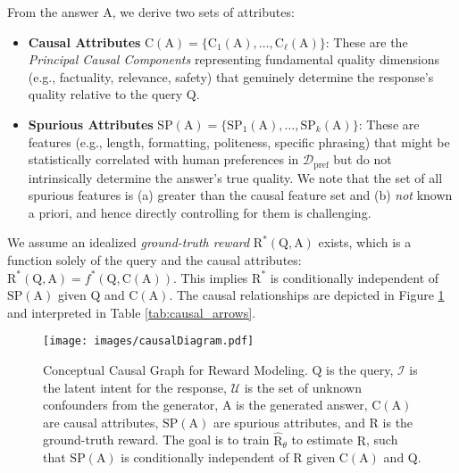 From the answer $\mathrm{A}$, we derive two sets of attributes:
\begin{itemize}[itemsep=0pt,left=0pt]
    \item \textbf{Causal Attributes} $\mathrm{C}(\mathrm{A}) = \{\mathrm{C}_1(\mathrm{A}), \dots, \mathrm{C}_\ell(\mathrm{A})\}$: These are the \textit{Principal Causal Components} representing fundamental quality dimensions (e.g., factuality, relevance, safety) that genuinely determine the response's quality relative to the query $\mathrm{Q}$.
    \item \textbf{Spurious Attributes} $\mathrm{SP}(\mathrm{A}) = \{\mathrm{SP}_1(\mathrm{A}), \dots, \mathrm{SP}_k(\mathrm{A})\}$: These are features (e.g., length, formatting, politeness, specific phrasing) that might be statistically correlated with human preferences in $\mathcal{D}_{\mathrm{pref}}$ but do not intrinsically determine the answer's true quality. We note that the set of all spurious features is (a) greater than the causal feature set and (b) \emph{not} known a priori, and hence directly controlling for them is challenging.
\end{itemize}
We assume an idealized \textit{ground-truth reward} $\mathrm{R}^*(\mathrm{Q}, \mathrm{A})$ exists, which is a function solely of the query and the causal attributes: $\mathrm{R}^*(\mathrm{Q}, \mathrm{A}) = f^*(\mathrm{Q}, \mathrm{C}(\mathrm{A}))$. This implies $\mathrm{R}^*$ is conditionally independent of $\mathrm{SP}(\mathrm{A})$ given $\mathrm{Q}$ and $\mathrm{C}(\mathrm{A})$. The causal relationships are depicted in Figure \ref{fig:causal_graph} and interpreted in Table \ref{tab:causal_arrows}.

\begin{figure}[t!]
\centering
\texttt{[image: images/causalDiagram.pdf]} 
\caption{Conceptual Causal Graph for Reward Modeling. $\mathrm{Q}$ is the query, $\mathcal{I}$ is the latent intent for the response, $\mathcal{U}$ is the set of unknown confounders from the generator, $\mathrm{A}$ is the generated answer, $\mathrm{C}(\mathrm{A})$ are causal attributes, $\mathrm{SP}(\mathrm{A})$ are spurious attributes, and $\mathrm{R}$ is the ground-truth reward. The goal is to train $\hat{\mathrm{R}}_\theta$ to estimate $\mathrm{R}$, such that $\mathrm{SP}(\mathrm{A})$ is conditionally independent of $\mathrm{R}$ given $\mathrm{C}(\mathrm{A})$ and $\mathrm{Q}$.}
\label{fig:causal_graph}
\end{figure}

